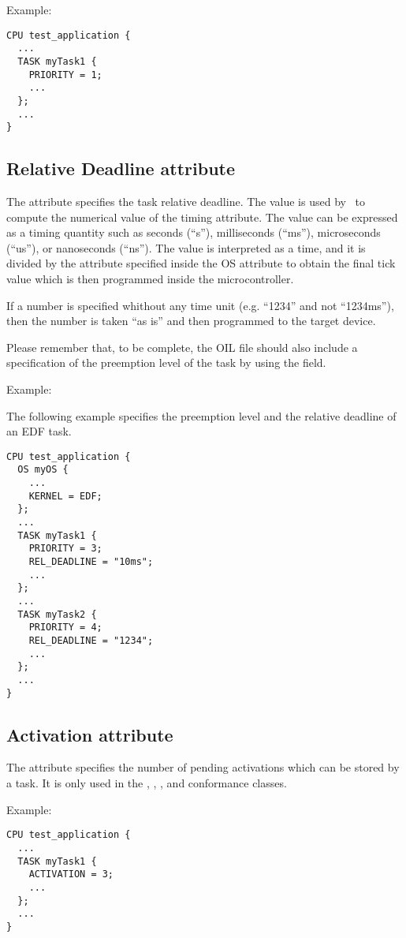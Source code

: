Example:

\begin{lstlisting}
CPU test_application {
  ...
  TASK myTask1 {
    PRIORITY = 1;
    ...
  };
  ...
}
\end{lstlisting}

\subsection{Relative Deadline attribute}
The  attribute specifies the task relative deadline. The
value is used by \rtd\ to compute the numerical value of the timing
attribute. The value can be expressed as a timing quantity such as
seconds (``s''), milliseconds (``ms''), microseconds (``us''), or
nanoseconds (``ns''). The value is interpreted as a time, and it is
divided by the  attribute specified inside the OS
attribute  to obtain the final tick value which is
then programmed inside the microcontroller.

If a number is specified whithout any time unit (e.g. ``1234'' and not
``1234ms''), then the number is taken ``as is'' and then programmed to
the target device.

Please remember that, to be complete, the OIL
file should also include a specification of the preemption level of
the task by using the  field.

Example:

The following example specifies the preemption level and the relative
deadline of an EDF task.

\begin{lstlisting}
CPU test_application {
  OS myOS {
    ...
    KERNEL = EDF;
  };
  ...
  TASK myTask1 {
    PRIORITY = 3;
    REL_DEADLINE = "10ms";
    ...
  };
  ...
  TASK myTask2 {
    PRIORITY = 4;
    REL_DEADLINE = "1234";
    ...
  };
  ...
}
\end{lstlisting}


\subsection{Activation attribute}
The  attribute specifies the number of pending
activations which can be stored by a task. It is only used in the
, , , and  conformance
classes.

Example:

\begin{lstlisting}
CPU test_application {
  ...
  TASK myTask1 {
    ACTIVATION = 3;
    ...
  };
  ...
}
\end{lstlisting}

